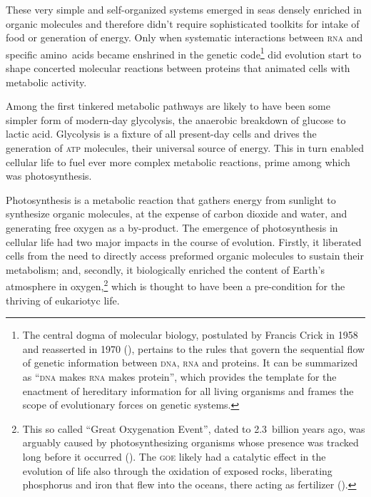 \documentclass{tufte-book}
\begin{document}
These very simple and \mbox{self-organized} systems emerged in seas densely
enriched in organic molecules and therefore didn't require sophisticated
toolkits for intake of food or generation of energy.  Only when systematic
interactions between \textsc{rna} and specific amino~acids became enshrined in
the genetic code\footnote{The central dogma of molecular biology, postulated by
  Francis Crick in 1958 and reasserted in 1970
  (\citealp{crick_protein_1958,crick_central_1970}), pertains to the rules that
  govern the sequential flow of genetic information between \textsc{dna},
  \textsc{rna} and proteins. It can be summarized as ``\textsc{dna} makes
  \textsc{rna} makes protein'', which provides the template for the enactment of
  hereditary information for all living organisms and frames the scope of
  evolutionary forces on genetic systems.} did evolution start to shape
concerted molecular reactions between proteins that animated cells with
metabolic activity.

Among the first tinkered metabolic pathways are likely to have been some simpler
form of \mbox{modern-day} glycolysis, the anaerobic breakdown of glucose to
lactic acid.  Glycolysis is a fixture of all \mbox{present-day} cells and drives
the generation of \textsc{atp} molecules, their universal source of energy.
This in turn enabled cellular life to fuel ever more complex metabolic
reactions, prime among which was photosynthesis.

Photosynthesis is a metabolic reaction that gathers energy from sunlight to
synthesize organic molecules, at the expense of carbon dioxide and water, and
generating free oxygen as a \mbox{by-product}.  The emergence of photosynthesis
in cellular life had two major impacts in the course of evolution.  Firstly, it
liberated cells from the need to directly access preformed organic molecules to
sustain their metabolism; and, secondly, it biologically enriched the content of
Earth's atmosphere in oxygen,\footnote{This so called ``Great Oxygenation
  Event'', dated to 2.3~billion years ago, was arguably caused by
  photosynthesizing organisms whose presence was tracked long before it occurred
  (\citealp{flannery_archean_2012}). The \textsc{goe} likely had a catalytic
  effect in the evolution of life also through the oxidation of exposed rocks,
  liberating phosphorus and iron that flew into the oceans, there acting as
  fertilizer (\citealp{zimmer_mystery_2013}).} which is thought to have been a
\mbox{pre-condition} for the thriving of eukariotyc life.

\end{document}
